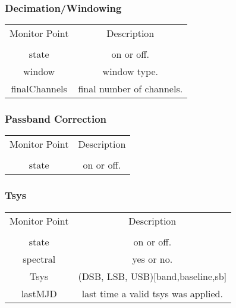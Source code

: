 \documentclass[11pt]{article}
\begin{document}
\subsubsection{Decimation/Windowing}
\label{sec:dmp}
\begin{center}
\begin{tabular}{|c|c|}
\hline
Monitor Point & Description \\
&\\
\hline\hline
state  & on or off.\\
window & window type.\\
finalChannels & final number of channels.\\
\hline
\end{tabular}
\end{center}

\subsubsection{Passband Correction}
\label{sec:pbmp}
\begin{center}
\begin{tabular}{|c|c|}
\hline
Monitor Point & Description \\
&\\
\hline\hline
state  & on or off.\\
\hline
\end{tabular}
\end{center}

\subsubsection{Tsys}
\label{sec:tysmp}
\begin{center}
\begin{tabular}{|c|c|}
\hline
Monitor Point & Description \\
&\\
\hline\hline
state  & on or off.\\
spectral & yes or no.\\
Tsys & (DSB, LSB, USB)[band,baseline,sb]\\
lastMJD & last time a valid tsys was applied.\\
\hline
\end{tabular}
\end{center}
\end{document}
